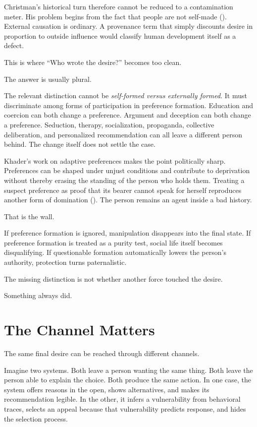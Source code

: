 \documentclass[
  10.5pt,
  letterpaper,
]{article}
\begin{document}
Christman's historical turn therefore cannot be reduced to a
contamination meter. His problem begins from the fact that people are
not self-made ().
External causation is ordinary. A provenance term that simply discounts
desire in proportion to outside influence would classify human
development itself as a defect.

This is where ``Who wrote the desire?'' becomes too clean.

The answer is usually plural.

The relevant distinction cannot be \emph{self-formed versus externally
formed}. It must discriminate among forms of participation in preference
formation. Education and coercion can both change a preference. Argument
and deception can both change a preference. Seduction, therapy,
socialization, propaganda, collective deliberation, and personalized
recommendation can all leave a different person behind. The change
itself does not settle the case.

Khader's work on adaptive preferences makes the point politically sharp.
Preferences can be shaped under unjust conditions and contribute to
deprivation without thereby erasing the standing of the person who holds
them. Treating a suspect preference as proof that its bearer cannot
speak for herself reproduces another form of domination
(). The person remains an
agent inside a bad history.

That is the wall.

If preference formation is ignored, manipulation disappears into the
final state. If preference formation is treated as a purity test, social
life itself becomes disqualifying. If questionable formation
automatically lowers the person's authority, protection turns
paternalistic.

The missing distinction is not whether another force touched the desire.

Something always did.

\section{The Channel Matters}\label{the-channel-matters}

The same final desire can be reached through different channels.

Imagine two systems. Both leave a person wanting the same thing. Both
leave the person able to explain the choice. Both produce the same
action. In one case, the system offers reasons in the open, shows
alternatives, and makes its recommendation legible. In the other, it
infers a vulnerability from behavioral traces, selects an appeal because
that vulnerability predicts response, and hides the selection process.
\end{document}
